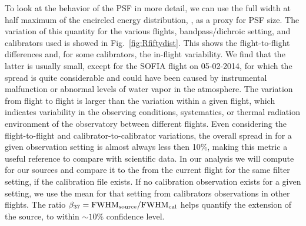 To look at the behavior of the PSF in more detail, we can use the full width at half maximum of the encircled energy distribution, \Rfifty, as a proxy for PSF size. The variation of this quantity for the various flights, bandpass/dichroic setting, and calibrators used is showed in Fig.~\ref{fig:Rfiftydist}. This shows the flight-to-flight differences and, for some calibrators, the in-flight variability. We find that the latter is usually small, except for the SOFIA flight on 05-02-2014, for which the spread is quite considerable and could have been caused by instrumental malfunction or abnormal levels of water vapor in the atmosphere. The variation from flight to flight is larger than the variation within a given flight, which indicates variability in the observing conditions, systematics, or thermal radiation environment of the observatory between different flights. Even considering the flight-to-flight and calibrator-to-calibrator variations, the overall spread in \Rfifty for a given observation setting is almost always less then 10\%, making this metric a useful reference to compare with scientific data. In our analysis we will compute \Rfifty for our sources and compare it to the \Rfifty from the current flight for the same filter setting, if the calibration file exists. If no calibration observation exists for a given setting, we use the mean \Rfifty for that setting from calibrators observations in other flights. The ratio $\beta_{37}=\textrm{FWHM}_\textrm{source}/\textrm{FWHM}_\textrm{cal}$ helps quantify the extension of the source, to within $\sim 10\%$ confidence level. 

